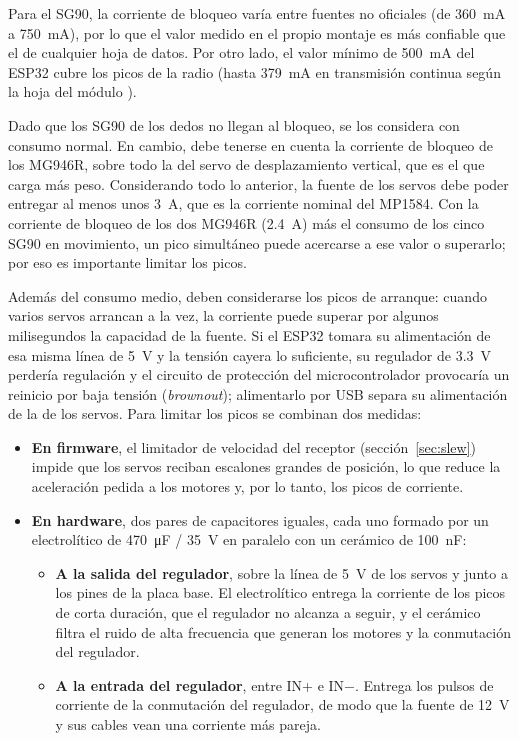 Para el SG90, la corriente de bloqueo varía entre fuentes no oficiales (de \SI{360}{\milli\ampere} a \SI{750}{\milli\ampere}), por lo que el valor medido en el propio montaje es más confiable que el de cualquier hoja de datos. Por otro lado, el valor mínimo de \SI{500}{\milli\ampere} del ESP32 cubre los picos de la radio (hasta \SI{379}{\milli\ampere} en transmisión continua según la hoja del módulo \cite{esp32_wroom_datasheet}).

Dado que los SG90 de los dedos no llegan al bloqueo, se los considera con consumo normal. En cambio, debe tenerse en cuenta la corriente de bloqueo de los MG946R, sobre todo la del servo de desplazamiento vertical, que es el que carga más peso. Considerando todo lo anterior, la fuente de los servos debe poder entregar al menos unos \SI{3}{\ampere}, que es la corriente nominal del MP1584. Con la corriente de bloqueo de los dos MG946R (\SI{2.4}{\ampere}) más el consumo de los cinco SG90 en movimiento, un pico simultáneo puede acercarse a ese valor o superarlo; por eso es importante limitar los picos.

Además del consumo medio, deben considerarse los picos de arranque: cuando varios servos arrancan a la vez, la corriente puede superar por algunos milisegundos la capacidad de la fuente. Si el ESP32 tomara su alimentación de esa misma línea de \SI{5}{\volt} y la tensión cayera lo suficiente, su regulador de \SI{3.3}{\volt} perdería regulación y el circuito de protección del microcontrolador provocaría un reinicio por baja tensión (\textit{brownout}); alimentarlo por USB separa su alimentación de la de los servos. Para limitar los picos se combinan dos medidas:

\begin{itemize}
    \item \textbf{En firmware}, el limitador de velocidad del receptor (sección~\ref{sec:slew}) impide que los servos reciban escalones grandes de posición, lo que reduce la aceleración pedida a los motores y, por lo tanto, los picos de corriente.
    \item \textbf{En hardware}, dos pares de capacitores iguales, cada uno formado por un electrolítico de \SI{470}{\micro\farad} / \SI{35}{\volt} en paralelo con un cerámico de \SI{100}{\nano\farad}:
    \begin{itemize}
        \item \textbf{A la salida del regulador}, sobre la línea de \SI{5}{\volt} de los servos y junto a los pines de la placa base. El electrolítico entrega la corriente de los picos de corta duración, que el regulador no alcanza a seguir, y el cerámico filtra el ruido de alta frecuencia que generan los motores y la conmutación del regulador.
        \item \textbf{A la entrada del regulador}, entre IN+ e IN$-$. Entrega los pulsos de corriente de la conmutación del regulador, de modo que la fuente de \SI{12}{\volt} y sus cables vean una corriente más pareja.
    \end{itemize}
\end{itemize}

